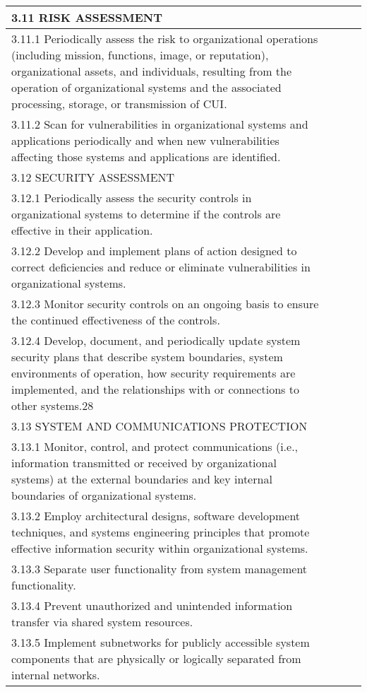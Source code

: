 \begin{longtable} {|p{}|p{}|p{}|p{} |}
{3.11 RISK ASSESSMENT}&&& \\ \hline
{3.11.1 Periodically assess the risk to organizational operations (including mission, functions, image, or reputation), organizational assets, and individuals, resulting from the operation of organizational systems and the associated processing, storage, or transmission of CUI.}&&& \\ \hline
{3.11.2 Scan for vulnerabilities in organizational systems and applications periodically and when new vulnerabilities affecting those systems and applications are identified.}&&& \\ \hline
{3.12 SECURITY ASSESSMENT}&&& \\ \hline
{3.12.1 Periodically assess the security controls in organizational systems to determine if the controls are effective in their application.}&&& \\ \hline
{3.12.2 Develop and implement plans of action designed to correct deficiencies and reduce or eliminate vulnerabilities in organizational systems.}&&& \\ \hline
{3.12.3 Monitor security controls on an ongoing basis to ensure the continued effectiveness of the controls.}&&& \\ \hline
{3.12.4 Develop, document, and periodically update system security plans that describe system boundaries, system environments of operation, how security requirements are implemented, and the relationships with or connections to other systems.28}&&& \\ \hline
{3.13 SYSTEM AND COMMUNICATIONS PROTECTION}&&& \\ \hline
{3.13.1 Monitor, control, and protect communications (i.e., information transmitted or received by organizational systems) at the external boundaries and key internal boundaries of organizational systems.}&&& \\ \hline
{3.13.2 Employ architectural designs, software development techniques, and systems engineering principles that promote effective information security within organizational systems.}&&& \\ \hline
{3.13.3 Separate user functionality from system management functionality.}&&& \\ \hline
{3.13.4 Prevent unauthorized and unintended information transfer via shared system resources.}&&& \\ \hline
{3.13.5 Implement subnetworks for publicly accessible system components that are physically or logically separated from internal networks.}&&& \\ \hline

\end{longtable}
